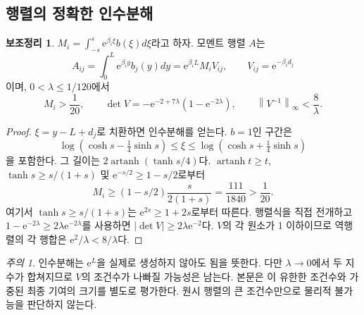 \documentclass[11pt,a4paper]{article}
\theoremstyle{definition}
\newtheorem{lemma}[theorem]{보조정리}
\theoremstyle{remark}\newtheorem{remark}[theorem]{주의}
\newcommand{\norm}[1]{\left\lVert #1\right\rVert}
\newcommand{\e}{\mathrm e}
\begin{document}
\subsection{행렬의 정확한 인수분해}
\begin{lemma}\label{matrixlemma}
$M_i=\int_{-s}^{s}\e^{\beta_i\xi}b(\xi)d\xi$라고 하자. 모멘트 행렬 $A$는
\begin{equation}\label{factor}
 A_{ij}=\int_0^L\e^{\beta_i y}b_j(y)dy
      =\e^{\beta_i L}M_i V_{ij},\qquad V_{ij}=\e^{-\beta_i d_j}
\end{equation}
이며, $0<\lambda\le1/120$에서
\begin{equation}\label{matrixbounds}
 M_i>\frac1{20},\qquad
 \det V=-\e^{-2+7\lambda}(1-\e^{-2\lambda}),\qquad
 \norm{V^{-1}}_\infty<\frac8\lambda.
\end{equation}
\end{lemma}
\begin{proof}
$\xi=y-L+d_j$로 치환하면 인수분해를 얻는다. $b=1$인 구간은
\begin{equation}
 \log(\cosh s-\tfrac14\sinh s)\le\xi\le
 \log(\cosh s+\tfrac14\sinh s)
\end{equation}
을 포함한다. 그 길이는 $2\operatorname{artanh}(\tanh s/4)$다. $\operatorname{artanh}t\ge t$, $\tanh s\ge s/(1+s)$ 및
$\e^{-s/2}\ge1-s/2$로부터
\begin{equation}
 M_i\ge(1-s/2)\frac{s}{2(1+s)}=\frac{111}{1840}>\frac1{20}.
\end{equation}
여기서 $\tanh s\ge s/(1+s)$는 $\e^{2s}\ge1+2s$로부터 따른다. 행렬식을 직접 전개하고
$1-\e^{-2\lambda}\ge2\lambda\e^{-2\lambda}$를 사용하면
$|\det V|\ge2\lambda\e^{-2}$다. $V$의 각 원소가 1 이하이므로 역행렬의 각 행합은 $\e^2/\lambda<8/\lambda$다.
\end{proof}

\begin{remark}
인수분해는 $\e^L$을 실제로 생성하지 않아도 됨을 뜻한다. 다만 $\lambda\to0$에서 두 지수가 합쳐지므로 $V$의 조건수가 나빠질 가능성은 남는다. 본문은 이 유한한 조건수와 가중된 최종 기여의 크기를 별도로 평가한다. 원시 행렬의 큰 조건수만으로 물리적 불가능을 판단하지 않는다.
\end{remark}
\end{document}
